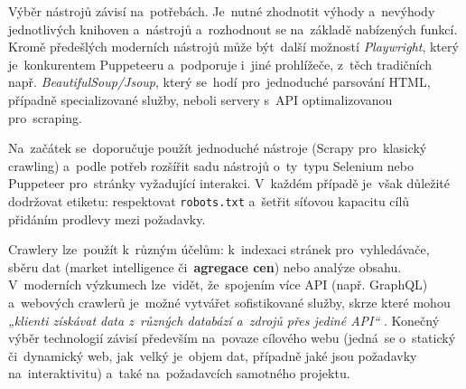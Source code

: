 Výběr nástrojů závisí na~potřebách. Je~nutné zhodnotit výhody a~nevýhody
jednotlivých knihoven a~nástrojů a~rozhodnout se na~základě nabízených
funkcí. Kromě předešlých moderních nástrojů může být~další možností
\emph{Playwright}, který je~konkurentem Puppeteeru a~podporuje i~jiné
prohlížeče, z~těch tradičních např. \emph{BeautifulSoup/Jsoup}, který
se~hodí pro~jednoduché parsování HTML, případně specializované služby,
neboli servery s~API optimalizovanou pro~scraping.

Na~začátek se~doporučuje použít jednoduché nástroje (Scrapy pro~klasický
crawling) a~podle potřeb rozšířit sadu nástrojů o~ty~typu Selenium nebo
Puppeteer pro~stránky vyžadující interakci. V~každém případě je~však
důležité dodržovat etiketu: respektovat \texttt{robots.txt}
\cite{YHVfLHsNlUItkF6G,adi8S69Mmo0Mi7FC} %
a~šetřit síťovou kapacitu cílů přidáním prodlevy mezi požadavky.

Crawlery lze~použít k~různým účelům: k~indexaci stránek pro~vyhledávače,
sběru dat (market intelligence či~\textbf{agregace cen}) nebo analýze obsahu.
V~moderních výzkumech lze~vidět, že~spojením více API (např. GraphQL)
a~webových crawlerů je~možné vytvářet sofistikované služby, skrze které
mohou \emph{„klienti získávat data z~různých databází a~zdrojů přes
jediné API“} \cite{YHVfLHsNlUItkF6G,Sj7FFY7SXnJ6m41T}. %
Konečný výběr technologií závisí především na~povaze cílového webu (jedná~se
o~statický či~dynamický web, jak~velký je~objem dat, případně jaké jsou
požadavky na~interaktivitu) a~také na~požadavcích samotného projektu.

\endinput
